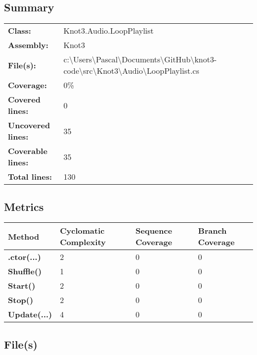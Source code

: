 \documentclass[a4paper,10pt]{article}
\begin{document}
\subsection{Summary}
\begin{longtable}[l]{ll}
\textbf{Class:} & Knot3.Audio.LoopPlaylist\\
\textbf{Assembly:} & Knot3\\
\textbf{File(s):} & \begin{minipage}[t]{12cm}{c:\textbackslash Users\textbackslash Pascal\textbackslash Documents\textbackslash GitHub\textbackslash knot3-code\textbackslash src\textbackslash Knot3\textbackslash Audio\textbackslash LoopPlaylist.cs}\end{minipage} \\
\textbf{Coverage:} & 0\%\\
\textbf{Covered lines:} & 0\\
\textbf{Uncovered lines:} & 35\\
\textbf{Coverable lines:} & 35\\
\textbf{Total lines:} & 130\\
\end{longtable}
\subsection{Metrics}
\begin{longtable}[l]{|l|l|l|l|}
\hline
\textbf{Method} & \textbf{Cyclomatic Complexity} & \textbf{Sequence Coverage} & \textbf{Branch Coverage}\\
\hline
\textbf{.ctor(...)} & 2 & 0 & 0\\
\hline
\textbf{Shuffle()} & 1 & 0 & 0\\
\hline
\textbf{Start()} & 2 & 0 & 0\\
\hline
\textbf{Stop()} & 2 & 0 & 0\\
\hline
\textbf{Update(...)} & 4 & 0 & 0\\
\hline
\end{longtable}
\subsection{File(s)}
\end{document}
